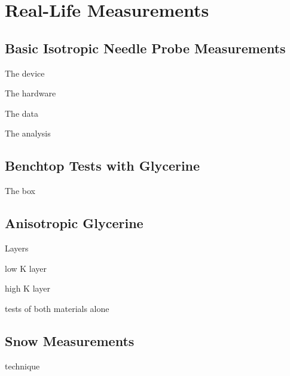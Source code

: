 \chapter{Real-Life Measurements}

\section{Basic Isotropic Needle Probe Measurements}

The device

The hardware

The data

The analysis

\section{Benchtop Tests with Glycerine}

The box

\section{Anisotropic Glycerine}

Layers

low K layer

high K layer

tests of both materials alone

\section{Snow Measurements}

technique
